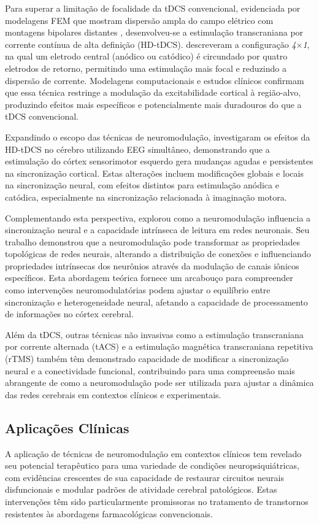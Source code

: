 Para superar a limitação de focalidade da tDCS convencional, evidenciada por modelagens FEM que mostram dispersão ampla do campo elétrico com montagens bipolares distantes \cite{datta2008transcranial}, desenvolveu-se a estimulação transcraniana por corrente contínua de alta definição (HD-tDCS).  descreveram a configuração \emph{4$\times$1}, na qual um eletrodo central (anódico ou catódico) é circundado por quatro eletrodos de retorno, permitindo uma estimulação mais focal e reduzindo a dispersão de corrente. Modelagens computacionais e estudos clínicos confirmam que essa técnica restringe a modulação da excitabilidade cortical à região-alvo, produzindo efeitos mais específicos e potencialmente mais duradouros do que a tDCS convencional.

Expandindo o escopo das técnicas de neuromodulação,  investigaram os efeitos da HD-tDCS no cérebro utilizando EEG simultâneo, demonstrando que a estimulação do córtex sensorimotor esquerdo gera mudanças agudas e persistentes na sincronização cortical. Estas alterações incluem modificações globais e locais na sincronização neural, com efeitos distintos para estimulação anódica e catódica, especialmente na sincronização relacionada à imaginação motora.

Complementando esta perspectiva,  explorou como a neuromodulação influencia a sincronização neural e a capacidade intrínseca de leitura em redes neuronais. Seu trabalho demonstrou que a neuromodulação pode transformar as propriedades topológicas de redes neurais, alterando a distribuição de conexões e influenciando propriedades intrínsecas dos neurônios através da modulação de canais iônicos específicos. Esta abordagem teórica fornece um arcabouço para compreender como intervenções neuromodulatórias podem ajustar o equilíbrio entre sincronização e heterogeneidade neural, afetando a capacidade de processamento de informações no córtex cerebral.

Além da tDCS, outras técnicas não invasivas como a estimulação transcraniana por corrente alternada (tACS) e a estimulação magnética transcraniana repetitiva (rTMS) também têm demonstrado capacidade de modificar a sincronização neural e a conectividade funcional, contribuindo para uma compreensão mais abrangente de como a neuromodulação pode ser utilizada para ajustar a dinâmica das redes cerebrais em contextos clínicos e experimentais.

\subsection{Aplicações Clínicas}
A aplicação de técnicas de neuromodulação em contextos clínicos tem revelado seu potencial terapêutico para uma variedade de condições neuropsiquiátricas, com evidências crescentes de sua capacidade de restaurar circuitos neurais disfuncionais e modular padrões de atividade cerebral patológicos. Estas intervenções têm sido particularmente promissoras no tratamento de transtornos resistentes às abordagens farmacológicas convencionais.

